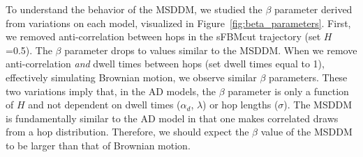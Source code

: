 \documentclass{article}
\begin{document}
  To understand the behavior of the MSDDM, we studied the $\beta$ parameter derived 
  from variations on each model, visualized in Figure~\ref{fig:beta_parameters}. First, 
  we removed anti-correlation between hops in the sFBMcut trajectory (set $H$=0.5). 
  The $\beta$ parameter drops to values similar to the MSDDM. When we remove anti-correlation
  \textit{and} dwell times between hops (set dwell times equal to 1), effectively simulating 
  Brownian motion, we observe similar $\beta$ parameters. These two variations imply that,
  in the AD models, the $\beta$ parameter is only a function of $H$ and not dependent on
  dwell times ($\alpha_d$, $\lambda$) or hop lengths ($\sigma$). The MSDDM is fundamentally similar to 
  the AD model in that one makes correlated draws from a hop distribution. Therefore,
  we should expect the $\beta$ value of the MSDDM to be larger than that of Brownian 
  motion.
  
\end{document}
